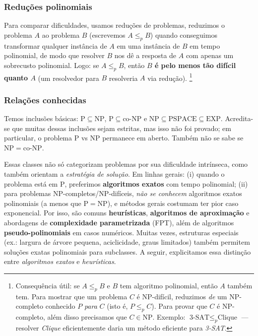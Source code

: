 \subsubsection{Reduções polinomiais}


Para comparar dificuldades, usamos reduções de problemas, reduzimos o problema \(A\) ao problema \(B\) (escrevemos \(A\le_p B\)) quando conseguimos transformar qualquer instância de \(A\) em uma instância de \(B\) em tempo polinomial, de modo que resolver \(B\) nos dê a resposta de \(A\) com apenas um sobrecusto polinomial. Logo: se \(A\le_p B\), então \textbf{\(B\) é pelo menos tão difícil quanto \(A\)} (um resolvedor para \(B\) resolveria \(A\) via redução). \footnote{Consequência útil: se \(A\le_p B\) e \(B\) tem algoritmo polinomial, então \(A\) também tem. Para mostrar que um problema \(C\) é NP-difícil, reduzimos \emph{de} um NP-completo conhecido \(P\) \emph{para} \(C\) (isto é, \(P\le_p C\)). Para provar que \(C\) é NP-completo, além disso precisamos que \(C\in\mathrm{NP}\). Exemplo: \(\text{3-SAT}\le_p \text{Clique}\) — resolver \textit{Clique} eficientemente daria um método eficiente para \textit{3-SAT}.}

\subsubsection{Relações conhecidas}


Temos inclusões básicas: \(\mathrm{P}\subseteq \mathrm{NP}\), \(\mathrm{P}\subseteq \mathrm{co\text{-}NP}\) e \(\mathrm{NP}\subseteq \mathrm{PSPACE}\subseteq \mathrm{EXP}\). Acredita-se que muitas dessas inclusões sejam estritas, mas isso não foi provado; em particular, o problema \(\mathrm{P}\) vs \(\mathrm{NP}\) permanece em aberto. Também não se sabe se \(\mathrm{NP}=\mathrm{co\text{-}NP}\).


Essas classes não só categorizam problemas por sua dificuldade intrínseca, como também orientam a \emph{estratégia de solução}. Em linhas gerais: (i) quando o problema está em \(\mathrm{P}\), preferimos \textbf{algoritmos exatos} com tempo polinomial; (ii) para problemas NP-completos/NP-difíceis, \emph{não se conhecem} algoritmos exatos polinomiais (a menos que \(\mathrm{P}=\mathrm{NP}\)), e métodos gerais costumam ter pior caso exponencial. Por isso, são comuns \textbf{heurísticas}, \textbf{algoritmos de aproximação} e abordagens de \textbf{complexidade parametrizada} (FPT), além de algoritmos \textbf{pseudo-polinomiais} em casos numéricos. Muitas vezes, estruturas especiais (ex.: largura de árvore pequena, aciclicidade, graus limitados) também permitem soluções exatas polinomiais para subclasses. A seguir, explicitamos essa distinção entre \emph{algoritmos exatos} e \emph{heurísticas}.

